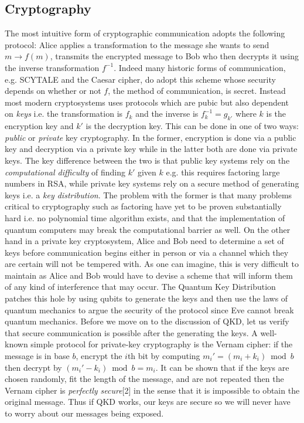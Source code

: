\documentclass[aps,prd,final,twocolumn,letterpaper]{revtex4}
\begin{document}
\subsection{Cryptography}
The most intuitive form of cryptographic communication adopts the following protocol: Alice applies a transformation to the message she wants to send $m\rightarrow f(m)$, transmits the encrypted message to Bob who then decrypts it using the inverse transformation $f^{-1}$. Indeed many historic forms of communication, e.g. SCYTALE and the Caesar cipher, do adopt this scheme whose security depends on whether or not $f$, the method of communication, is secret. Instead most modern cryptosystems uses protocols which are pubic but also dependent on \emph{keys} i.e. the transformation is $f_k$ and the inverse is $f^{-1}_k = g_{k'}$ where $k$ is the encryption key and $k'$ is the decryption key. This can be done in one of two ways: \emph{public} or \emph{private} key cryptography. In the former, encryption is done via a public key and decryption via a private key while in the latter both are done via private keys. The key difference between the two is that public key systems rely on the \emph{computational difficulty} of finding $k'$ given $k$ e.g. this requires factoring large numbers in RSA, while private key systems rely on a secure method of generating keys i.e. a \emph{key distribution}. The problem with the former is that many problems critical to cryptography such as factoring have yet to be proven substantially hard i.e. no polynomial time algorithm exists, and that the implementation of quantum computers may break the computational barrier as well. On the other hand in a private key cryptosystem, Alice and Bob need to determine a set of keys before communication begins either in person or via a channel which they are certain will not be tempered with. As one can imagine, this is very difficult to maintain as Alice and Bob would have to devise a scheme that will inform them of any kind of interference that may occur. The Quantum Key Distribution patches this hole by using qubits to generate the keys and then use the laws of quantum mechanics to argue the security of the protocol since Eve cannot break quantum mechanics. Before we move on to the discussion of QKD, let us verify that secure communication is possible after the generating the keys. A well-known simple protocol for private-key cryptography is the Vernam cipher: if the message is in base $b$, encrypt the $i$th bit by computing $m_i' = (m_i+k_i) \bmod b$ then decrypt by $(m_i'-k_i)\bmod b = m_i$. It can be shown that if  the keys are chosen randomly, fit the length of the message, and are not repeated then the Vernam cipher is \emph{perfectly secure}[2] in the sense that it is impossible to obtain the original message. Thus if QKD works, our keys are secure so we will never have to worry about our messages being exposed.
\end{document}
